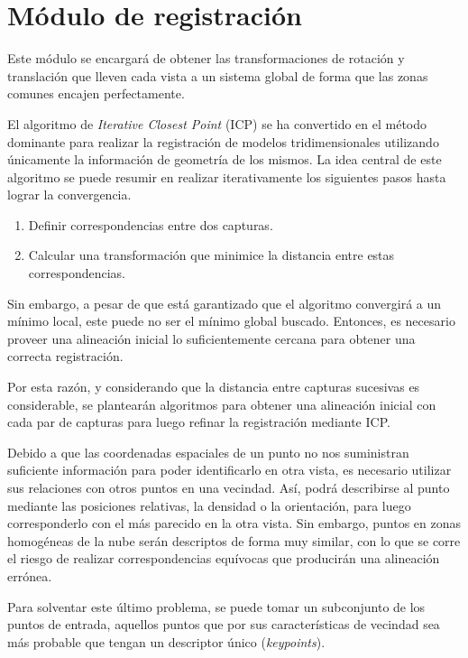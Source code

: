 \section{Módulo de registración}
	Este módulo se encargará de obtener las transformaciones de rotación y translación
	que lleven cada vista a un sistema global de forma
	que las zonas comunes encajen perfectamente.



	El algoritmo de \emph{Iterative Closest Point} (ICP) se ha convertido en el
	método dominante para realizar la registración de modelos tridimensionales
	utilizando únicamente la información de geometría de los mismos. \cite{Rusinkiewicz02real-time3d}
	La idea central de este algoritmo se puede resumir en realizar
	iterativamente los siguientes pasos hasta lograr la convergencia.
	\begin{enumerate}
		\item Definir correspondencias entre dos capturas.
		\item Calcular una transformación que minimice la distancia entre estas correspondencias. \cite{conf/rss/SegalHT09}
	\end{enumerate}
	Sin embargo, a pesar de que está garantizado que el algoritmo convergirá a un mínimo local,
	este puede no ser el mínimo global buscado. Entonces, es necesario proveer una alineación inicial
	lo suficientemente cercana para obtener una correcta registración.\cite{regBesl92}

	Por esta razón, y considerando que la distancia entre capturas sucesivas es
	considerable, se plantearán algoritmos para obtener una alineación inicial
	con cada par de capturas para luego refinar la registración mediante ICP.


	Debido a que las coordenadas espaciales de un punto no nos suministran suficiente
	información para poder identificarlo en otra vista, es necesario utilizar
	sus relaciones con otros puntos en una vecindad.
	Así, podrá describirse al punto mediante las posiciones relativas, la
	densidad o la orientación, para luego corresponderlo con el más parecido en
	la otra vista.
	Sin embargo, puntos en zonas homogéneas de la nube serán descriptos de
	forma muy similar, con lo que se corre el riesgo de realizar
	correspondencias equívocas que producirán una alineación errónea.

	Para solventar este último problema, se puede tomar un subconjunto de los
	puntos de entrada, aquellos puntos que por sus características de vecindad
	sea más probable que tengan un descriptor único (\emph{keypoints}).





